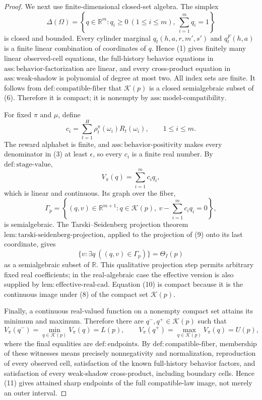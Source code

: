 \documentclass{article}
\begin{document}
\begin{proof}
We next use finite-dimensional closed-set algebra.  The simplex
\[
 \Delta(\Omega)=\left\{q\in\mathbb R^m:q_i\geq0\ (1\leq i\leq m),\ \sum_{i=1}^m q_i=1\right\}
\tag{6}
\]
is closed and bounded.  Every cylinder marginal \(q_t(h,a,r,m',s')\) and \(q_t^F(h,a)\) is a finite linear combination of coordinates of \(q\).  Hence (1) gives finitely many linear observed-cell equations, the full-history behavior equations in \(\mathrm{ass{:}behavior\text{-}factorization}\) are linear, and every cross-product equation in \(\mathrm{ass{:}weak\text{-}shadow}\) is polynomial of degree at most two.  All index sets are finite.  It follows from \(\mathrm{def{:}compatible\text{-}fiber}\) that \(\mathcal K(p)\) is a closed semialgebraic subset of (6).  Therefore it is compact; it is nonempty by \(\mathrm{ass{:}model\text{-}compatibility}\).

For fixed \(\pi\) and \(\mu\), define
\[
 c_i=\sum_{t=1}^H\rho_t^\pi(\omega_i)R_t(\omega_i),
 \qquad 1\leq i\leq m.
\tag{7}
\]
The reward alphabet is finite, and \(\mathrm{ass{:}behavior\text{-}positivity}\) makes every denominator in (3) at least \(\epsilon\), so every \(c_i\) is a finite real number.  By \(\mathrm{def{:}stage\text{-}value}\),
\[
 V_\pi(q)=\sum_{i=1}^m c_iq_i,
\tag{8}
\]
which is linear and continuous.  Its graph over the fiber,
\[
 \Gamma_p=\left\{(q,v)\in\mathbb R^{m+1}:q\in\mathcal K(p),\ v-\sum_{i=1}^m c_iq_i=0\right\},
\tag{9}
\]
is semialgebraic.  The Tarski--Seidenberg projection theorem \(\mathrm{lem{:}tarski\text{-}seidenberg\text{-}projection}\), applied to the projection of (9) onto its last coordinate, gives
\[
 \{v:\exists q\ ((q,v)\in\Gamma_p)\}=\Theta_I(p)
\tag{10}
\]
as a semialgebraic subset of \(\mathbb R\).  This qualitative projection step permits arbitrary fixed real coefficients; in the real-algebraic case the effective version is also supplied by \(\mathrm{lem{:}effective\text{-}real\text{-}cad}\).  Equation (10) is compact because it is the continuous image under (8) of the compact set \(\mathcal K(p)\).

Finally, a continuous real-valued function on a nonempty compact set attains its minimum and maximum.  Therefore there are \(q^-,q^+\in\mathcal K(p)\) such that
\[
 V_\pi(q^-)=\min_{q\in\mathcal K(p)}V_\pi(q)=L(p),
 \qquad
 V_\pi(q^+)=\max_{q\in\mathcal K(p)}V_\pi(q)=U(p),
\tag{11}
\]
where the final equalities are \(\mathrm{def{:}endpoints}\).  By \(\mathrm{def{:}compatible\text{-}fiber}\), membership of these witnesses means precisely nonnegativity and normalization, reproduction of every observed cell, satisfaction of the known full-history behavior factors, and satisfaction of every weak-shadow cross-product, including boundary cells.  Hence (11) gives attained sharp endpoints of the full compatible-law image, not merely an outer interval.
\end{proof}
\end{document}
